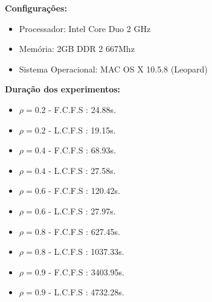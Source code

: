 \textbf{Configurações:}

\begin{itemize}
  \item Processador: Intel Core Duo 2 GHz 
  \item Memória: 2GB DDR 2 667Mhz
  \item Sistema Operacional: MAC OS X 10.5.8 (Leopard)
\end{itemize}

\textbf{Duração dos experimentos:}

\begin{itemize}
  \item $\rho=0.2$ - F.C.F.S : 24.88s.
  \item $\rho=0.2$ - L.C.F.S : 19.15s.
  \item $\rho=0.4$ - F.C.F.S : 68.93s.
  \item $\rho=0.4$ - L.C.F.S : 27.58s.
  \item $\rho=0.6$ - F.C.F.S : 120.42s.
  \item $\rho=0.6$ - L.C.F.S : 27.97s.
  \item $\rho=0.8$ - F.C.F.S : 627.45s.
  \item $\rho=0.8$ - L.C.F.S : 1037.33s.
  \item $\rho=0.9$ - F.C.F.S : 3403.95s.
  \item $\rho=0.9$ - L.C.F.S : 4732.28s.
\end{itemize}

